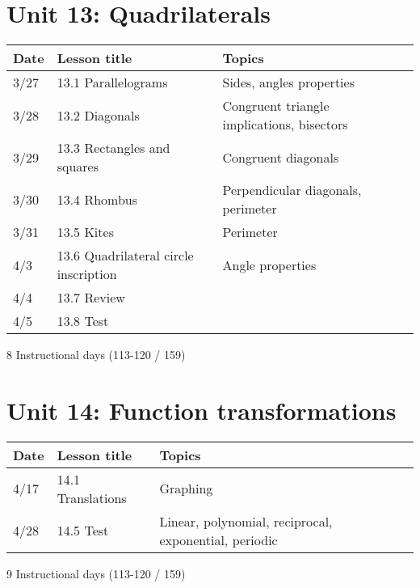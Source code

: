 \documentclass[12pt, twoside]{article}
\begin{document}
\section*{Unit 13: Quadrilaterals}
\begin{tabular}{|p{0.9cm}|p{4cm}|p{7cm}|p{5cm}|}
  \hline
  Date & Lesson title & Topics  &  \\
  \hline
  3/27 & 13.1 Parallelograms & Sides, angles properties &  \\
  \hline
  3/28 & 13.2 Diagonals & Congruent triangle implications, bisectors &  \\
  \hline
  3/29 & 13.3 Rectangles and squares & Congruent diagonals &  \\
  \hline
  3/30 & 13.4 Rhombus & Perpendicular diagonals, perimeter &  \\
  \hline
  3/31 & 13.5 Kites & Perimeter &  \\
  \hline
  4/3 & 13.6 Quadrilateral circle inscription & Angle properties & \\
  \hline
  4/4 & 13.7 Review &  &  \\
  \hline
  4/5 & 13.8 Test &  &  \\
  \hline

\end{tabular} \par \vspace*{0.3cm}
8 Instructional days (113-120 / 159)


\section*{Unit 14: Function transformations}
\begin{tabular}{|p{0.9cm}|p{4cm}|p{7cm}|p{5cm}|}
  \hline
  Date & Lesson title & Topics  &  \\
  \hline
  4/17 & 14.1 Translations & Graphing &  \\
  \hline
  4/28 & 14.5 Test & Linear, polynomial, reciprocal, exponential, periodic &  \\
  \hline


\end{tabular} \par \vspace*{0.3cm}
9 Instructional days (113-120 / 159)
\end{document}
